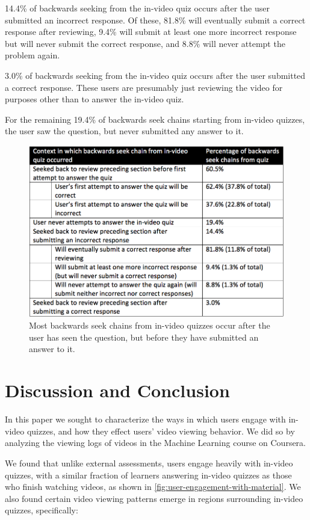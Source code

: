 \documentclass{sigchi}
\begin{document}
14.4\% of backwards seeking from the in-video quiz occurs after the user submitted an incorrect response. Of these, 81.8\% will eventually submit a correct response after reviewing, 9.4\% will submit at least one more incorrect response but will never submit the correct response, and 8.8\% will never attempt the problem again.

3.0\% of backwards seeking from the in-video quiz occurs after the user submitted a correct response. These users are presumably just reviewing the video for purposes other than to answer the in-video quiz.

For the remaining 19.4\% of backwards seek chains starting from in-video quizzes, the user saw the question, but never submitted any answer to it.

\begin{figure}
\includegraphics[width=1.0\columnwidth]{backseeks-and-quizzes}
\caption{Most backwards seek chains from in-video quizzes occur after the user has seen the question, but before they have submitted an answer to it.}
\label{fig:backseeks-and-quizzes}
\end{figure}

\section{Discussion and Conclusion}

In this paper we sought to characterize the ways in which users engage with in-video quizzes, and how they effect users' video viewing behavior. We did so by analyzing the viewing logs of videos in the Machine Learning course on Coursera.

We found that unlike external assessments, users engage heavily with in-video quizzes, with a similar fraction of learners answering in-video quizzes as those who finish watching videos, as shown in \autoref{fig:user-engagement-with-material}. We also found certain video viewing patterns emerge in regions surrounding in-video quizzes, specifically: %
\end{document}
